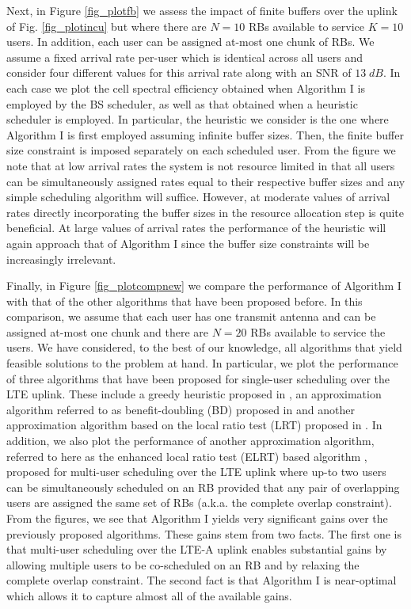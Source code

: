 \documentclass[11pt] {article}
\begin{document}
Next, in Figure \ref{fig_plotfb} we assess the impact of finite buffers over the uplink of Fig. \ref{fig_plotincu} but where there are $N=10$ RBs available to service $K=10$ users. In addition, each user can be assigned at-most one chunk of RBs. We assume a  fixed arrival rate per-user which is identical across all users and consider four different values for this arrival rate along with an SNR of $13\;dB$. In each case we plot the cell spectral efficiency obtained when Algorithm I is employed by the BS scheduler, as well as that obtained when a heuristic scheduler is employed. In particular, the heuristic we consider is the one where Algorithm I is first employed assuming infinite buffer sizes. Then, the finite buffer size constraint is imposed separately on each scheduled user.
From the figure we note that at low arrival rates the system is not resource limited in that all users can be simultaneously assigned   rates equal to their respective buffer sizes and any simple scheduling algorithm will suffice. However, at moderate values of arrival rates directly incorporating the buffer sizes in the resource allocation step is quite beneficial. At large values of arrival rates the performance of the heuristic will again approach that of Algorithm I since the buffer size constraints will be increasingly irrelevant.

Finally, in Figure \ref{fig_plotcompnew} we compare the performance of Algorithm I with that of the other algorithms that have been proposed before. In this comparison, we assume that each user has one transmit antenna and can be assigned at-most one chunk and there are $N=20$ RBs available to service the users. We have considered, to the best of our knowledge, all algorithms that   yield  feasible solutions to the problem at hand. In particular, we plot the performance of three algorithms that have been proposed for single-user scheduling over the LTE uplink. These include a greedy heuristic proposed in \cite{Lee-UL-2009}, an approximation algorithm referred to as benefit-doubling (BD) proposed in \cite{multiserver:2009} and another
approximation algorithm based on the local ratio test (LRT) proposed in \cite{Yang:ULinfo}. In addition, we also plot the performance of another approximation algorithm, referred to here as the enhanced local ratio test (ELRT) based algorithm \cite{prasad:wiopt12}, proposed for multi-user scheduling over the LTE uplink where up-to two users can be simultaneously scheduled on an RB provided that any pair of overlapping users are assigned the same set of RBs (a.k.a. the complete overlap constraint). From the figures, we see that Algorithm I yields very significant gains over the previously proposed algorithms. These gains stem from two facts. The first one is that multi-user scheduling over the LTE-A uplink enables substantial gains by allowing multiple users to be co-scheduled on an RB and by relaxing the complete overlap constraint. The second fact is that Algorithm I is near-optimal which allows it to capture almost all of the available gains.
\end{document}
